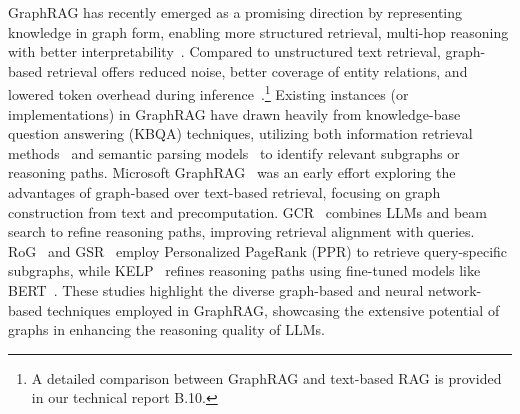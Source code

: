 GraphRAG has recently emerged as a promising direction by representing knowledge in graph form, enabling more structured retrieval, multi-hop reasoning with  better interpretability~\cite{GraphRAG, RAGvsGraphRAG, 2501.13958}.
Compared to unstructured text retrieval, graph-based retrieval offers reduced noise, better coverage of entity relations,
and lowered token overhead during inference~\cite{ToG2.0, GraphRAG, NewArticles, Podcast}.\footnote{A detailed comparison between GraphRAG and text-based RAG is provided in our technical report B.10.} 
Existing instances (or implementations) in GraphRAG have drawn heavily from knowledge-base question answering (KBQA) techniques, utilizing both information retrieval methods~\cite{ref:wikimovie, EmbedKGQA} and semantic parsing models~\cite{QGG, HGNet} to identify relevant subgraphs or reasoning paths. 
Microsoft GraphRAG~\cite{GraphRAG} was an early effort exploring the advantages of graph-based over text-based retrieval, focusing on graph construction from text and precomputation. 
GCR~\cite{GCR} combines LLMs and beam search to refine reasoning paths, improving retrieval alignment with queries. RoG~\cite{RoG} and GSR~\cite{LessIsMore} employ Personalized PageRank (PPR) to retrieve query-specific subgraphs, while KELP~\cite{ref:kelp} refines reasoning paths using fine-tuned models like BERT~\cite{bert}. These studies highlight the diverse graph-based and neural network-based techniques employed in GraphRAG, showcasing the extensive potential of graphs in enhancing the reasoning quality of LLMs.

